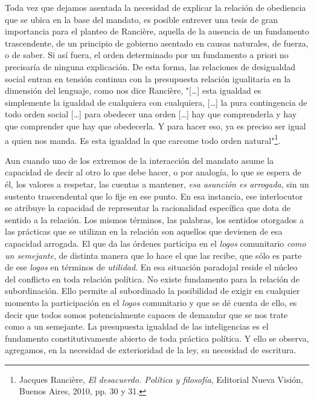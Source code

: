 \documentclass{book}
\begin{document}
Toda vez que dejamos asentada la necesidad de explicar la relación de
obediencia que se ubica en la base del mandato, es posible entrever una
tesis de gran importancia para el planteo de Rancière, aquella de la
ausencia de un fundamento trascendente, de un principio de gobierno
asentado en causas naturales, de fuerza, o de saber. Si así fuera, el
orden determinado por un fundamento a priori no precisaría de ninguna
explicación. De esta forma, las relaciones de desigualdad social entran
en tensión continua con la presupuesta relación igualitaria en la
dimensión del lenguaje, como nos dice Rancière, "{[}\ldots{]} esta
igualdad es simplemente la igualdad de cualquiera con cualquiera,
{[}\ldots{]} la pura contingencia de todo orden social {[}\ldots{]} para
obedecer una orden {[}\ldots{]} hay que comprenderla y hay que
comprender que hay que obedecerla. Y para hacer eso, ya es preciso ser
igual a quien nos manda. Es esta igualdad la que carcome todo orden
natural"\footnote{Jacques Rancière, \emph{El desacuerdo. Política y
  filosofía}, Editorial Nueva Visión, Buenos Aires, 2010, pp. 30 y 31.}.

Aun cuando uno de los extremos de la interacción del mandato asume la
capacidad de decir al otro lo que debe hacer, o por analogía, lo que se
espera de él, los valores a respetar, las cuentas a mantener, \emph{esa
asunción es arrogada}, sin un sustento trascendental que lo fije en ese
punto. En esa instancia, ese interlocutor se atribuye la capacidad de
representar la racionalidad específica que dota de sentido a la
relación. Los mismos términos, las palabras, los sentidos otorgados a
las prácticas que se utilizan en la relación son aquellos que devienen
de esa capacidad arrogada. El que da las órdenes participa en el
\emph{logos} comunitario \emph{como un semejante}, de distinta manera
que lo hace el que las recibe, que sólo es parte de ese \emph{logos} en
términos de \emph{utilidad}. En esa situación paradojal reside el núcleo
del conflicto en toda relación política. No existe fundamento para la
relación de subordinación. Ello permite al subordinado la posibilidad de
exigir en cualquier momento la participación en el \emph{logos}
comunitario y que se dé cuenta de ello, es decir que todos somos
potencialmente capaces de demandar que se nos trate como a un semejante.
La presupuesta igualdad de las inteligencias es el fundamento
constitutivamente abierto de toda práctica política. Y ello se observa,
agregamos, en la necesidad de exterioridad de la ley, su necesidad de
escritura.
\end{document}
